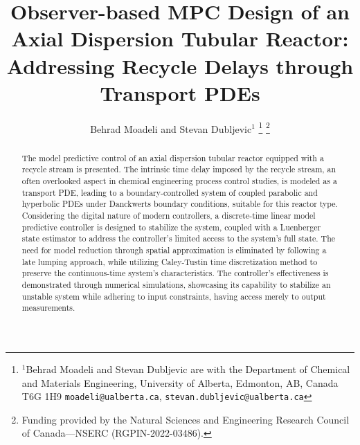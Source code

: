 \documentclass[letterpaper, 10 pt, conference]{ieeeconf}  %
\title{\LARGE \bf
Observer-based MPC Design of an Axial Dispersion Tubular Reactor:\\ Addressing Recycle Delays through Transport PDEs
}
\author{Behrad Moadeli and Stevan Dubljevic$^{1}$%
\thanks{$^{1}$Behrad Moadeli and Stevan Dubljevic are with the Department of Chemical and Materials Engineering,
University of Alberta, Edmonton, AB, Canada T6G 1H9
{\tt\small moadeli@ualberta.ca}, {\tt\small stevan.dubljevic@ualberta.ca}}%
\thanks{Funding provided by the Natural Sciences and Engineering Research Council of Canada—NSERC (RGPIN-2022-03486).}%
}
\begin{document}
\maketitle
\thispagestyle{empty}
\pagestyle{empty}


\begin{abstract}

        The model predictive control of an axial dispersion tubular reactor equipped with a recycle stream is presented. The intrinsic time delay imposed by the recycle stream, an often overlooked aspect in chemical engineering process control studies, is modeled as a transport PDE, leading to a boundary-controlled system of coupled parabolic and hyperbolic PDEs under Danckwerts boundary conditions, suitable for this reactor type. Considering the digital nature of modern controllers, a discrete-time linear model predictive controller is designed to stabilize the system, coupled with a Luenberger state estimator to address the controller's limited access to the system's full state. The need for model reduction through spatial approximation is eliminated by following a late lumping approach, while utilizing Caley-Tustin time discretization method to preserve the continuous-time system's characteristics. The controller's effectiveness is demonstrated through numerical simulations, showcasing its capability to stabilize an unstable system while adhering to input constraints, having access merely to output measurements.

\end{abstract}







% 

% 

\balance

\end{document}
